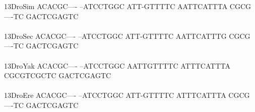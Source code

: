 \documentclass[11pt,twoside,reqno,a4paper]{article}
\begin{document}
{13\hspace*{2\charwidth}DroSim	ACACGC----	--ATCCTGGC	ATT-GTTTTC	AATTCATTTA	CGCG----TC	GACTCGAGTC	\\
\hspace*{4\charwidth}\hspace*{7\charwidth}\hspace*{1\charwidth}\hspace*{1\charwidth}\hspace*{1\charwidth}\hspace*{1\charwidth}\hspace*{1\charwidth}\hspace*{1\charwidth}\\
13\hspace*{2\charwidth}DroSec	ACACGC----	--ATCCTGGC	ATT-GTTTTC	AATTCATTTG	CGCG----TC	GACTCGAGTC	\\
\hspace*{4\charwidth}\hspace*{7\charwidth}\hspace*{1\charwidth}\hspace*{1\charwidth}\hspace*{1\charwidth}\hspace*{1\charwidth}\hspace*{1\charwidth}\hspace*{1\charwidth}\\
13\hspace*{2\charwidth}DroYak	ACACGC----	--ATCCTGGC	AATTGTTTTC	ATTTCATTTA	CGCGTCGCTC	GACTCGAGTC	\\
\hspace*{4\charwidth}\hspace*{7\charwidth}\hspace*{1\charwidth}\hspace*{1\charwidth}\hspace*{1\charwidth}\hspace*{1\charwidth}\hspace*{1\charwidth}\hspace*{1\charwidth}\\
13\hspace*{2\charwidth}DroEre	ACACGC----	--ATCCTGGC	ATT-GTTTTC	ATTTCATTTA	CGCG----TC	GACTCGAGTC	\\
\hspace*{4\charwidth}\hspace*{7\charwidth}\hspace*{1\charwidth}\hspace*{1\charwidth}\hspace*{1\charwidth}\hspace*{1\charwidth}\hspace*{1\charwidth}\hspace*{1\charwidth}\\
}
\end{document}
